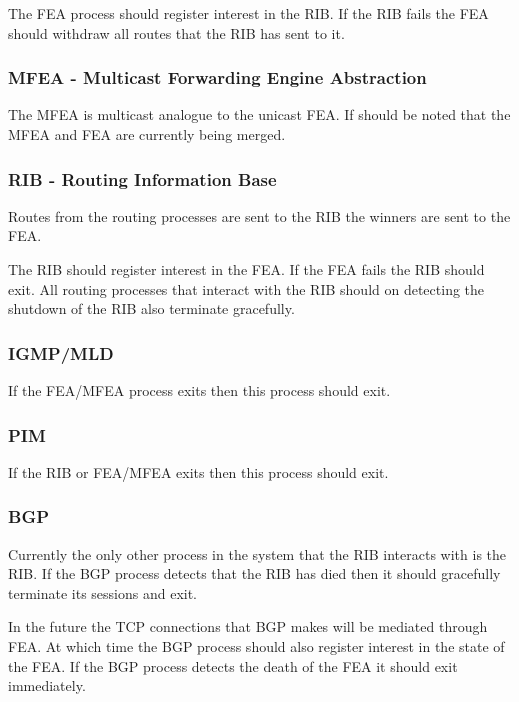 \documentclass[11pt]{article}
\begin{document}
The FEA process should register interest in the RIB. If the RIB fails
the FEA should withdraw all routes that the RIB has sent to it.

\subsubsection{MFEA - Multicast Forwarding Engine Abstraction}

The MFEA is multicast analogue to the unicast FEA. If should be noted
that the MFEA and FEA are currently being merged.

\subsubsection{RIB - Routing Information Base}

Routes from the routing processes are sent to the RIB the winners are
sent to the FEA.

The RIB should register interest in the FEA. If the FEA fails the RIB
should exit. All routing processes that interact with the RIB should
on detecting the shutdown of the RIB also terminate gracefully.

\subsubsection{IGMP/MLD}

If the FEA/MFEA process exits then this process should exit.

\subsubsection{PIM}

If the RIB or FEA/MFEA exits then this process should exit.

\subsubsection{BGP}

Currently the only other process in the system that the RIB interacts
with is the RIB. If the BGP process detects that the RIB has died then
it should gracefully terminate its sessions and exit.

In the future the TCP connections that BGP makes will be mediated
through FEA. At which time the BGP process should also register
interest in the state of the FEA. If the BGP process detects the death
of the FEA it should exit immediately.
\end{document}

